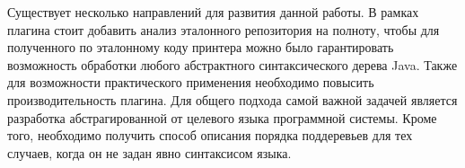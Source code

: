 
Существует несколько направлений для развития данной работы.
В рамках плагина стоит добавить
анализ эталонного репозитория на полноту, чтобы для полученного по
эталонному коду принтера можно было гарантировать возможность
обработки любого абстрактного синтаксического дерева Java.
Также для возможности практического применения необходимо повысить
производительность плагина.
Для общего подхода самой важной задачей является разработка
абстрагированной от целевого языка программной системы. Кроме того,
необходимо получить способ описания порядка поддеревьев для тех
случаев, когда он не задан явно синтаксисом языка.

